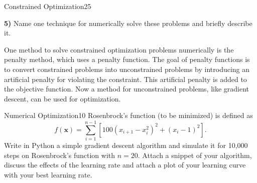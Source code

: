\begin{questions}
\begin{question}{Constrained Optimization}{25}
\begin{figure}[h]
	\label{fig:cubic}
\end{figure}
\textbf{5)} Name one technique for numerically solve these problems and briefly describe it.
\begin{answer}
One method to solve constrained optimization problems numerically is the penalty method, which uses a penalty function. The goal of penalty functions is to convert constrained problems into unconstrained problems by introducing an artificial penalty for violating the constraint. This artificial penalty is added to the objective function. Now a method for unconstrained problems, like gradient descent, can be used for optimization.
\end{answer}

\end{question}
	


\begin{question}{Numerical Optimization}{10}
Rosenbrock's function (to be minimized) is defined as 
$$f(\boldsymbol{x}) = \sum_{i=1}^{n-1} \left[ 100 (x_{i+1} - x_{i}^{2})^{2} + (x_{i} - 1)^{2}\right].$$
Write in Python a simple gradient descent algorithm and simulate it for 10,000 steps on Rosenbrock's function with $n=20$. Attach a snippet of your algorithm, discuss the effects of the learning rate and attach a plot of your learning curve with your best learning rate.


\end{question}
\end{questions}
